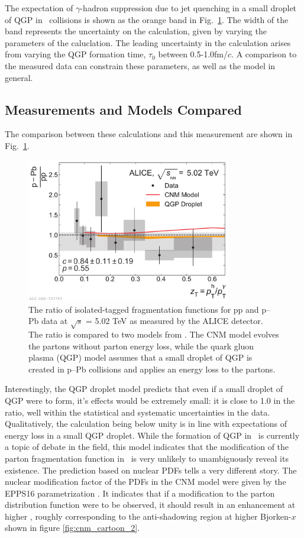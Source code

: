 The expectation of $\gamma$-hadron suppression due to jet quenching in a small droplet of QGP in \pPb~collisions is shown as the orange band in Fig.~\ref{fig:FF_model}. The width of the band represents the uncertainty on the calculation, given by varying the parameters of the caluclation. The leading uncertainty in the calculation arises from varying the QGP formation time, $\tau_0$ between 0.5-1.0fm/$c$. A comparison to the measured data can constrain these parameters, as well as the model in general.

\subsection{Measurements and Models Compared}
\label{sec:comparison}

The comparison between these calculations and this measurement are shown in Fig.~\ref{fig:FF_model}.

\begin{figure}[htpb]
  \centering
  \includegraphics[width=0.8\textwidth]{FF_Model_Comparisons_Ratio.pdf}
  \caption{The ratio of isolated-tagged fragmentation functions for pp and p–Pb data at $\sqrt{s}$ = 5.02 TeV as measured by the ALICE detector.  The ratio is compared to two models from \cite{Xie2021}. The CNM model evolves the partons without parton energy loss, while the quark gluon plasma (QGP) model assumes that a small droplet of QGP is created in p–Pb collisions and applies an energy loss to the partons.}
  \label{fig:FF_model}
\end{figure}
Interestingly, the QGP droplet model predicts that even if a small droplet of QGP were to form, it's effects would be extremely small: it is close to 1.0 in the ratio, well within the statistical and systematic uncertainties in the data. Qualitatively, the calculation being below unity is in line with expectations of energy loss in a small QGP droplet. While the formation of QGP in \pPb~is currently a topic of debate in the field, this model indicates that the modification of the parton fragmentation function in \pPb~is very unlikely to unambiguously reveal its existence. The prediction based on nuclear PDFs tells a very different story. The nuclear modification factor of the PDFs in the CNM model were given by the EPPS16 parametrization \cite{Eskola2017a}. It indicates that if a modification to the parton distribution function were to be observed, it should result in an enhancement at higher \zt, roughly corresponding to the anti-shadowing region at higher Bjorken-$x$ shown in figure \ref{fig:cnm_cartoon_2}. 

